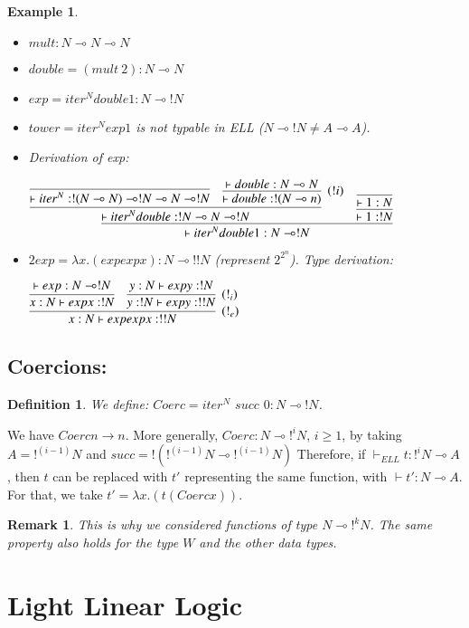 \documentclass[a4paper,10pt]{article}
\newcommand{\limpl}{\multimap}  %
\newtheorem{definition}{Definition}
\newtheorem{ex}{Example}
\newtheorem{rmk}{Remark}
\begin{document}
\begin{ex}
\begin{itemize}
\item $mult: N \limpl N \limpl N$
\item $double=(mult\ 2): N \limpl N$
\item $exp=iter^N double 1: N \limpl !N$
\item $tower=iter^N exp 1$ is not typable in ELL ($N\limpl !N \neq A\limpl A$).
\item Derivation of exp:
\begin{center}
$	\infer{\vdash iter^N double 1: N \limpl !N}{
		\infer{\vdash iter^N double: !N \limpl N \limpl !N}{
			\infer{\vdash iter^N: !(N\limpl N) \limpl !N \limpl N \limpl !N}{}
			&
			\infer[(!i)]{\vdash double:!(N\limpl n)}{\vdash double:N\limpl N}
		}
		&
		\infer{\vdash 1:!N}{\infer{\vdash 1:N}{}}
	}$
\end{center}

\item $2exp= \lambda x.(exp exp x): N \limpl !!N$ (represent $2^{2^{n}}$). Type derivation:
\begin{center}
$	\infer[(!_e)]{x:N \vdash exp exp x: !!N}{
		\infer{x:N \vdash exp x: !N}{\vdash exp:N \limpl !N}
		&
		\infer[(!_i)]{y:!N \vdash exp y:!!N}{y:N \vdash exp y:!N}
	}$
\end{center}
\end{itemize}

\end{ex}


\subsection{Coercions:}
\begin{definition}
We define: $Coerc = iter^N$ $succ$ $0: N \limpl !N$.
\end{definition}

 We have $Coerc n \rightarrow n$.
 More generally, $Coerc: N \limpl !^i N$, $i\geq 1$, by taking $A=!^{(i-1)} N$ and $succ=!(!^{(i-1)} N \limpl !^{(i-1)} N)$
 Therefore, if $\vdash_{ELL} t: !^{i} N \limpl A$, then $t$ can be replaced with $t'$ representing the same function, with $\vdash t':N \limpl A$. For that, we take $t' = \lambda x.(t (Coerc x))$.

\begin{rmk}
This is why we considered functions of type $N \limpl !^k N$. The same property also holds for the type $W$ and the other data types.
\end{rmk}




\section{Light Linear Logic}


\end{document}
